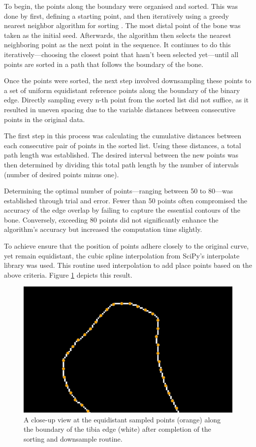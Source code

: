 \documentclass{micro-econ-thesis}
\begin{document}
To begin, the points along the boundary were organised and sorted. This was done by first, defining a starting point, and then iteratively using a greedy nearest neighbor algorithm for sorting \parencite{Hinneburg2000neare-5849}. The most distal point of the bone was taken as the initial seed. Afterwards, the algorithm then selects the nearest neighboring point as the next point in the sequence. It continues to do this iteratively—choosing the closest point that hasn't been selected yet—until all points are sorted in a path that follows the boundary of the bone.


Once the points were sorted, the next step involved downsampling these points to a set of uniform equidistant reference points along the boundary of the binary edge. Directly sampling every n-th point from the sorted list did not suffice, as it resulted in uneven spacing due to the variable distances between consecutive points in the original data.

The first step in this process was calculating the cumulative distances between each consecutive pair of points in the sorted list. Using these distances, a total path length was established. The desired interval between the new points was then determined by dividing this total path length by the number of intervals (number of desired points minus one). 

Determining the optimal number of points—ranging between 50 to 80—was established through trial and error. Fewer than 50 points often compromised the accuracy of the edge overlap by failing to capture the essential contours of the bone. Conversely, exceeding 80 points did not significantly enhance the algorithm's accuracy but increased the computation time slightly. 

To achieve ensure that the position of points adhere closely to the original curve, yet remain equidistant, the cubic spline interpolation from SciPy's interpolate library was used. This routine used interpolation to add place points based on the above criteria. 
Figure \ref{fig:downsampled} depicts this result. 
\begin{figure}[H]
	\centering
	\includegraphics[width=0.7\linewidth]{downsampled}
	\caption{A close-up view at the equidistant sampled points (orange) along the boundary of the tibia edge (white) after completion of the sorting and downsample routine. }
	\label{fig:downsampled}
\end{figure}
\end{document}
